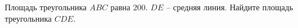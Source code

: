 \begin{ex}
	\begin{condition}
		Площадь треугольника \( ABC  \) равна \( 200 \). \( DE \) – средняя линия. Найдите площадь треугольника \( CDE \).
	\end{condition}
\end{ex}